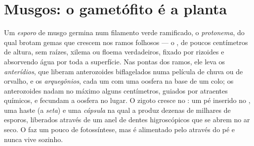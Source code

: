 \section{Musgos: o gametófito é a planta}

\begin{definition}\label{def:b2:plant-life-cycles:moss}
Um \emph{esporo} de musgo germina num filamento verde ramificado, o
\emph{protonema}, do qual brotam gemas que crescem nos ramos folhosos
--- o \emph{}, de poucos centímetros de altura, sem raízes,
xilema ou floema verdadeiros, fixado por rizoides e absorvendo água
por toda a superfície. Nas pontas dos ramos, ele leva os
\emph{anterídios}, que liberam anterozoides biflagelados numa película
de chuva ou de orvalho, e os \emph{arquegônios}, cada um com uma
oosfera na base de um colo; os anterozoides nadam no máximo alguns
centímetros, guiados por atraentes químicos, e fecundam a oosfera no
lugar. O zigoto cresce no \emph{}: um pé inserido no
, uma haste (a \emph{seta}) e uma \emph{cápsula} na qual a
 produz dezenas de milhares de esporos, liberados através de um
anel de dentes higroscópicos que se abrem no ar seco. O  faz
um pouco de fotossíntese, mas é alimentado pelo  através do
pé e nunca vive sozinho.
\end{definition}

